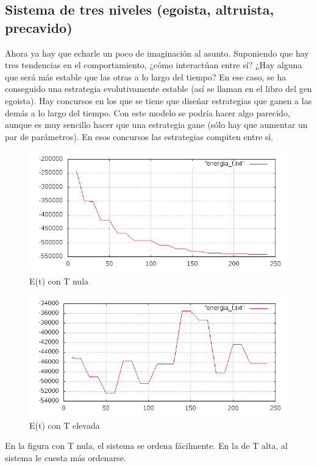 \documentclass[a4paper,10pt,twocolumn]{article}
\begin{document}
\subsection*{Sistema de tres niveles (egoista, altruista, precavido)}

Ahora ya hay que echarle un poco de imaginaci\'on al asunto. Suponiendo que hay tres tendencias en el comportamiento, ¿c\'omo interact\'uan entre s\'i? ¿Hay alguna que ser\'a m\'as estable que las otras a lo largo del tiempo? En ese caso, se ha conseguido una estrategia evolutivamente estable (as\'i se llaman en el libro del gen egoista). Hay concursos en los que se tiene que dise\'nar estrategias que ganen a las dem\'as a lo largo del tiempo. Con este modelo se podr\'ia hacer algo parecido, aunque es muy sencillo hacer que una estrategia gane (s\'olo hay que aumentar un par de par\'ametros). En esos concursos las estrategias compiten entre s\'i.
\begin{figure}
\includegraphics[scale=.4]{E-0-1-0-precavido.png}
\caption{E(t) con T nula}
\end{figure}
\begin{figure}
\includegraphics[scale=.4]{E-10000-1-0-precavido.png}
\caption{E(t) con T elevada}
\end{figure}

En la figura con T nula, el sistema se ordena f\'acilmente. En la de T alta, al sistema le cuesta m\'as ordenarse.
\end{document}
